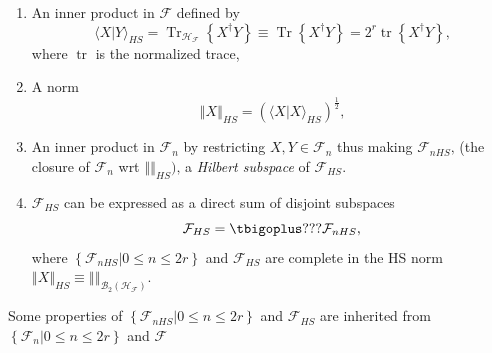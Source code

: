 \documentclass[aps, preprint]{revtex4}
\begin{document}
\begin{enumerate}
\item An inner product in $\mathcal{F}$ defined by
\begin{equation} \langle \left .X\right \vert Y \rangle _{H S} =\ensuremath{\operatorname*{Tr}}_{\mathcal{H}_{\mathcal{F}}} \left \{X^{ \dag } Y\right \} \equiv \ensuremath{\operatorname*{Tr}} \left \{X^{ \dag } Y\right \} =2^{r} \ensuremath{\operatorname*{tr}}\left \{X^{ \dag } Y\right \}\text{,}
\end{equation}where $\ensuremath{\operatorname*{tr}}$ is the normalized trace, 

\item A norm
\begin{equation}\left \Vert X\right \Vert _{H S} =\left ( \langle \left .X\right \vert X \rangle _{H S}\right )^{\frac{1}{2}}\text{,}
\end{equation}

\item An inner product in $\mathcal{F}_{n}$ by restricting $X ,Y \in \mathcal{F}_{n}$ thus making $\mathcal{F}_{n H S}\text{,}$ (the closure of $\mathcal{F}_{n}$ wrt $\left \Vert \text{}\right \Vert _{H S})\text{,}$ a \emph{Hilbert subspace} of $\mathcal{F}_{H S}\text{.}$ 

\item $\mathcal{F}_{H S}$ can be expressed as a direct sum of disjoint subspaces
\begin{equation}\mathcal{F}_{H S} =\tbigoplus ???\mathcal{F}_{n H S}\text{,}
\end{equation}where $\left \{\left .\mathcal{F}_{n H S}\right \vert 0 \leq n \leq 2 r\right \}$ and $\mathcal{F}_{H S}$ are complete in the HS norm $\left \Vert X\right \Vert _{H S} \equiv \left \Vert \text{}\right \Vert _{\mathcal{B}_{2} \left (\mathcal{H}_{\mathcal{F}}\right )}\text{.}$ \end{enumerate}


Some properties of $\left \{\left .\mathcal{F}_{n H S}\right \vert 0 \leq n \leq 2 r\right \}$ and $\mathcal{F}_{H S}$ are inherited from $\left \{\left .\mathcal{F}_{n}\right \vert 0 \leq n \leq 2 r\right \}$ and $\mathcal{F}$ 
\end{document}
